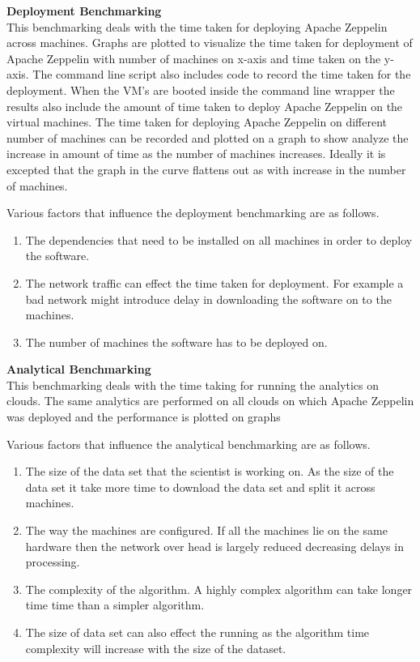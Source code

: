 \documentclass[9pt,twocolumn,twoside]{../../styles/osajnl}
\begin{document}
	{\bf \hspace{-3ex}Deployment Benchmarking}
	\\
	This benchmarking deals with the time taken for deploying Apache 
	Zeppelin across machines. Graphs are plotted to visualize the 
	time 
	taken for deployment of Apache Zeppelin with number of machines 
	on 
	x-axis and time taken on the y-axis. The command line script also 
	includes code to record the time taken for the deployment. When 
	the 
	VM's are booted inside the command line wrapper the 
	results 
	also include the amount of time taken to deploy Apache Zeppelin 
	on 
	the virtual machines. The time taken for deploying Apache 
	Zeppelin on 
	different number of machines can be recorded and plotted on a 
	graph 
	to show analyze the increase in amount of time as the number of 
	machines increases. Ideally it is excepted that the graph in the 
	curve flattens out as with increase in the number of machines.
	
	Various factors that influence the deployment benchmarking are as 
	follows.
	\begin{enumerate}
		\item The dependencies that need to be installed on all 
		machines 
		in order to deploy the software.
		\item The network traffic can effect the time taken for 
		deployment. For example a bad network might introduce delay 
		in 
		downloading the software on to the machines.
		\item The number of machines the software has to be deployed 
		on. 
	\end{enumerate}
	
	{\bf\hspace{-3ex} Analytical Benchmarking}
	\\
	This benchmarking deals with the time taking for running the 
	analytics on clouds. The same analytics are performed on all  
	clouds on which Apache Zeppelin was deployed and the performance 
	is 
	plotted on graphs
	
	Various factors that influence the analytical benchmarking are as 
	follows.
	\begin{enumerate}
		\item The size of the data set that the scientist is working 
		on. 
		As the size of the data set it take more time to download the 
		data set and split it across machines.
		\item The way the machines are configured. If all the 
		machines 
		lie on the same hardware then the network over head is 
		largely 
		reduced decreasing delays in processing.
		\item The complexity of the algorithm. A highly complex 
		algorithm 
		can take longer time time than a simpler algorithm.
		\item The size of data set can also effect the running as the 
		algorithm time complexity will increase with the size of the 
		dataset.
	\end{enumerate}
	
\end{document}
